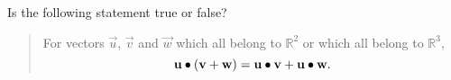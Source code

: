 \documentclass{ximera}
\author{Gregory Hartman \and Matthew Carr}
\begin{document}
\begin{exercise}



Is the following statement true or false?

\begin{quote}
For vectors $\vec{u}$, $\vec{v}$ and $\vec{w}$ which all belong to  $\mathbb{R}^2$ or which all belong to $\mathbb{R}^3$, 
\[
\mathbf{u}\bullet(\mathbf{v}+\mathbf{w})=\mathbf{u}\bullet\mathbf{v}+\mathbf{u}\bullet\mathbf{w}\ldotp
\]
\end{quote}

\begin{multipleChoice}
\end{multipleChoice}

\end{exercise}
\end{document}
